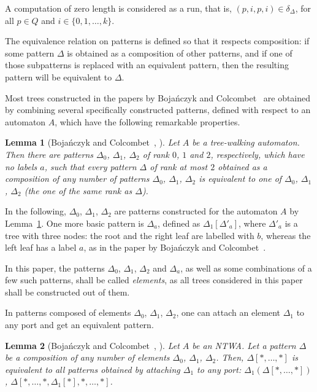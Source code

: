 \documentclass[12pt,a4paper]{article}
\newtheorem{lemma}{Lemma}
\theoremstyle{definition}
\begin{document}
A computation of zero length is considered as a run,
that is, $(p,i,p,i) \in \delta_{\Delta}$,
for all $p \in Q$ and $i \in \{0,1, \ldots, k\}$.

The equivalence relation on patterns is defined so that it respects composition:
if some pattern $\Delta$ is obtained as a composition of other patterns,
and if one of those subpatterns is replaced with an equivalent pattern,
then the resulting pattern will be equivalent to $\Delta$.

Most trees constructed in the papers
by Boja\'nczyk and Colcombet~\cite{BojanczykColcombet_det,BojanczykColcombet_reg}
are obtained by combining several specifically constructed patterns,
defined with respect to an automaton $A$,
which have the following remarkable properties.

\begin{lemma}[Boja\'nczyk and Colcombet~{\cite[Lemma 9]{BojanczykColcombet_det}}, {\cite[Lemma 3.1]{BojanczykColcombet_reg}}]
\label{lemma_delta_123}
Let $A$ be a tree-walking automaton.
Then there are patterns $\Delta_0$, $\Delta_1$, $\Delta_2$
of rank $0$, $1$ and $2$, respectively,
which have no labels $a$,
such that every pattern $\Delta$ of rank at most $2$
obtained as a composition of any number of patterns $\Delta_0$, $\Delta_1$, $\Delta_2$
is equivalent to one of $\Delta_0$, $\Delta_1$, $\Delta_2$
(the one of the same rank as $\Delta$).
\end{lemma}

In the following, $\Delta_0$, $\Delta_1$, $\Delta_2$
are patterns constructed for the automaton $A$ by Lemma~\ref{lemma_delta_123}.
One more basic pattern is $\Delta_a$, defined as $\Delta_1[\Delta'_a]$,
where $\Delta'_a$ is a tree with three nodes:
the root and the right leaf are labelled with $b$, 
whereas the left leaf has a label $a$,
as in the paper by Boja\'nczyk and Colcombet~\cite{BojanczykColcombet_reg}.

In this paper, the patterns $\Delta_0$, $\Delta_1$, $\Delta_2$ and $\Delta_a$,
as well as some combinations of a few such patterns,
shall be called \emph{elements},
as all trees considered in this paper shall be constructed out of them.

In patterns composed of elements $\Delta_0$, $\Delta_1$, $\Delta_2$,
one can attach an element $\Delta_1$ to any port and get an equivalent pattern.

\begin{lemma}[Boja\'nczyk and Colcombet~{\cite[Lemma 8]{BojanczykColcombet_det}}, {\cite[Fact 3.2]{BojanczykColcombet_reg}}]
\label{lemma_attaching_Delta_1}
Let $A$ be an NTWA.
Let a pattern $\Delta$ be a composition of any number of elements $\Delta_0$, $\Delta_1$, $\Delta_2$.
Then, $\Delta[*, \ldots, *]$ is equivalent to all patterns
obtained by attaching $\Delta_1$ to any port:
$\Delta_1(\Delta[*, \ldots, *])$,
$\Delta[*, \ldots, *, \Delta_1[*], *, \ldots, *]$.
\end{lemma}
\end{document}
